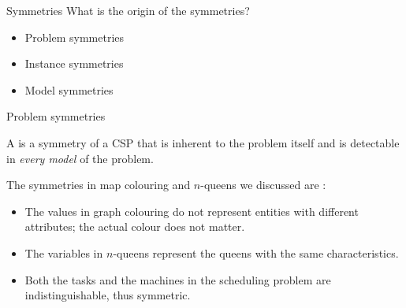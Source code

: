 \documentclass{cons-beamer}
\begin{document}
\begin{frame}{Symmetries}
  What is the origin of the symmetries?
  \vfill
  
  \vfill

  \begin{itemize}
    \item Problem symmetries \vfill
    \item Instance symmetries \vfill
    \item Model symmetries
  \end{itemize}
\end{frame}

\begin{frame}{Problem symmetries}
  \begin{definition}
    A  is a symmetry of a CSP that is inherent to the problem itself and is detectable in \textit{every model} of the problem. 
  \end{definition}
  \vfill

  The symmetries in map colouring and $n$-queens we discussed are :
  \vfill

  \begin{itemize}
    \item The values in graph colouring do not represent entities with different attributes; the actual colour does not matter.
      \vfill
    \item The variables in $n$-queens represent the queens with the same characteristics.
      \vfill
    \item Both the tasks and the machines in the scheduling problem are indistinguishable, thus symmetric.
  \end{itemize}
\end{frame}
\end{document}
